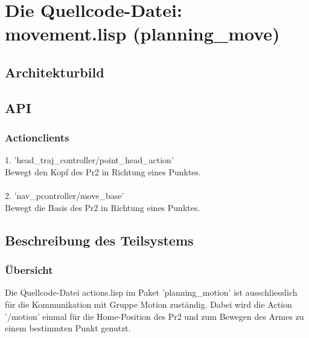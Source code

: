 \documentclass{suturo}
\begin{document}
\newpage
\section{Die Quellcode-Datei: movement.lisp (planning\_move)}
\subsection{Architekturbild}


\begin{figure}[!htb]
\end{figure}


\subsection{API}
\subsubsection{Actionclients}
1. 'head\_traj\_controller/point\_head\_action' \\
Bewegt den Kopf des Pr2 in Richtung eines Punktes.\\ \\
2. 'nav\_pcontroller/move\_base' \\
Bewegt die Basis des Pr2 in Richtung eines Punktes.
\subsection{Beschreibung des Teilsystems}

\subsubsection{\"Ubersicht}
Die Quellcode-Datei actions.lisp im Paket 'planning\_motion'  ist ausschliesslich für die Kommunikation mit Gruppe Motion zuständig. Dabei wird die Action '/motion' einmal für die Home-Position des Pr2 und zum Bewegen des Armes zu einem bestimmten Punkt genutzt.
\end{document}
